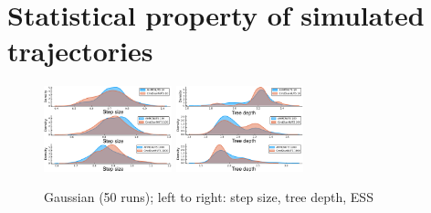 \documentclass[tablecaption=bottom,wcp]{jmlr} %
\begin{document}
\section{Statistical property of simulated trajectories}
\label{app:stat-prop}
\begin{figure}[h!]
    \includegraphics[width=0.33\textwidth]{images/Gaussian/density_epsilon.pdf}
    \includegraphics[width=0.33\textwidth]{images/Gaussian/density_tree_depth.pdf}
    \;\hfill
    \hfill\;
    \caption{Gaussian (50 runs); left to right: step size, tree depth, ESS}
    \label{fig:gauss}
\end{figure}
\end{document}
